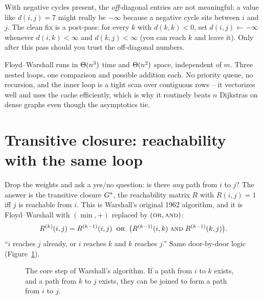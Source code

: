 \begin{trapbox}
With negative cycles present, the \emph{off}-diagonal entries are not meaningful: a value like
$d(i,j)=7$ might really be $-\infty$ because a negative cycle sits between $i$ and $j$. The clean fix is
a post-pass: for every $k$ with $d(k,k)<0$, set $d(i,j)\leftarrow-\infty$ whenever $d(i,k)<\infty$ and
$d(k,j)<\infty$ (you can reach $k$ and leave it). Only after this pass should you trust the off-diagonal
numbers.
\end{trapbox}

\begin{complexitybox}
Floyd--Warshall runs in $\Theta(n^3)$ time and $\Theta(n^2)$ space, independent of $m$. Three nested loops,
one comparison and possible addition each. No priority queue, no recursion, and the inner loop is a
tight scan over contiguous rows -- it vectorizes well and uses the cache efficiently, which is why it routinely beats
$n$ Dijkstras on dense graphs even though the asymptotics tie.
\end{complexitybox}

\section{Transitive closure: reachability with the same loop}
\label{ch09:closure}

Drop the weights and ask a yes/no question: is there \emph{any} path from $i$ to $j$? The answer
is the transitive closure $G^{*}$, the reachability matrix $R$ with $R(i,j)=1$ iff $j$ is reachable
from $i$. This is Warshall's original 1962 algorithm, and it is Floyd--Warshall with $(\min,+)$ replaced
by $(\textsc{or},\textsc{and})$:
\[
  R^{(k)}(i,j) = R^{(k-1)}(i,j)\;\;\textsc{or}\;\;\big(R^{(k-1)}(i,k)\;\textsc{and}\;R^{(k-1)}(k,j)\big).
\]
``$i$ reaches $j$ already, or $i$ reaches $k$ and $k$ reaches $j$.'' Same door-by-door logic (Figure~\ref{fig:transitive-closure}).

\begin{figure}[htbp]
\centering
{}
\caption{The core step of Warshall's algorithm. If a path from $i$ to $k$ exists, and a path from $k$ to $j$ exists, they can be joined to form a path from $i$ to $j$.}
\label{fig:transitive-closure}
\end{figure}

